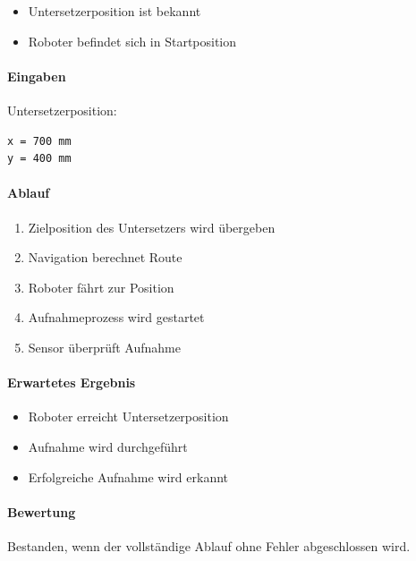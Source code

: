 \begin{itemize}
\tightlist
\item
  Untersetzerposition ist bekannt
\item
  Roboter befindet sich in Startposition
\end{itemize}

\paragraph{Eingaben}\label{eingaben-13}

Untersetzerposition:

\begin{verbatim}
x = 700 mm
y = 400 mm
\end{verbatim}

\paragraph{Ablauf}\label{ablauf-13}

\begin{enumerate}
\def\labelenumi{\arabic{enumi}.}
\tightlist
\item
  Zielposition des Untersetzers wird übergeben
\item
  Navigation berechnet Route
\item
  Roboter fährt zur Position
\item
  Aufnahmeprozess wird gestartet
\item
  Sensor überprüft Aufnahme
\end{enumerate}

\paragraph{Erwartetes Ergebnis}\label{erwartetes-ergebnis-13}

\begin{itemize}
\tightlist
\item
  Roboter erreicht Untersetzerposition
\item
  Aufnahme wird durchgeführt
\item
  Erfolgreiche Aufnahme wird erkannt
\end{itemize}

\paragraph{Bewertung}\label{bewertung-13}

Bestanden, wenn der vollständige Ablauf ohne Fehler abgeschlossen wird.

